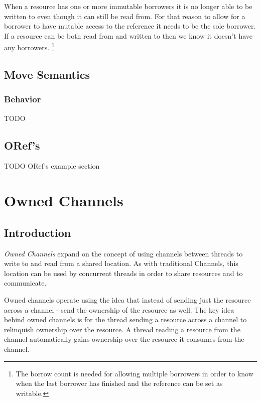 \documentclass[onehalf,11pt]{beavtex}
\begin{document}
When a resource has one or more immutable borrowers it is no longer able to be
written to even though it can still be read from.  For that reason to allow for
a borrower to have mutable access to the reference it needs to be the sole
borrower. If a resource can be both read from and written to then we know it
doesn't have any borrowers. \footnote{ The borrow count is needed for allowing
  multiple borrowers in order to know when the last borrower has finished and
  the reference can be set as writable. }



\section{Move Semantics}

\subsection{Behavior}

TODO


\section{ORef's}

TODO ORef's example section




\chapter{Owned Channels}

\section{Introduction}

\textit{Owned Channels} expand on the concept of using channels between threads
to write to and read from a shared location.   As with traditional Channels,
this location can be used by concurrent threads in order to share resources and
to communicate.


Owned channels operate using the idea that instead of sending just the
resource across a channel - send the ownership of the resource as well.
The key idea behind owned channels is for the thread sending a
resource across a channel to relinquish ownership over the resource.
A thread reading a resource from the channel automatically gains ownership over
the resource it consumes from the channel.
\end{document}
